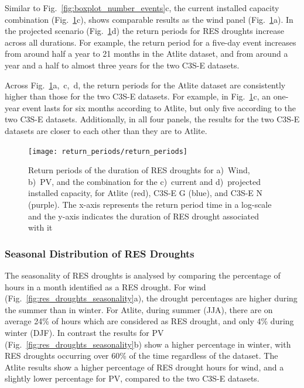 \documentclass[a4paper, 11pt]{article}
\begin{document}
Similar to Fig.~\ref{fig:boxplot_number_events}c, the current installed capacity combination (Fig.~\ref{fig:return_periods}c), shows comparable results as the wind panel (Fig.~\ref{fig:return_periods}a). In the projected scenario (Fig.~\ref{fig:return_periods}d) the return periods for RES droughts increase across all durations. For example, the return period for a five-day event increases from around half a year to 21 months in the Atlite dataset, and from around a year and a half to almost three years for the two C3S-E datasets.

Across Fig.~\ref{fig:return_periods}a,~c,~d, the return periods for the Atlite dataset are consistently higher than those for the two C3S-E datasets. For example, in Fig.~\ref{fig:return_periods}c, an one-year event lasts for six months according to Atlite, but only five according to the two C3S-E datasets. Additionally, in all four panels, the results for the two C3S-E datasets are closer to each other than they are to Atlite.

\begin{figure}[!ht]
	\centering
	\texttt{[image: return\_periods/return\_periods]}
	\caption{Return periods of the duration of RES droughts for a)~Wind, b)~PV, and the combination for the c)~current and d)~projected installed capacity, for Atlite (red), C3S-E G (blue), and C3S-E N (purple). The x-axis represents the return period time in a log-scale and the y-axis indicates the duration of RES drought associated with it}
	\label{fig:return_periods}
\end{figure}

\newpage
\subsubsection{Seasonal Distribution of RES Droughts}

The seasonality of RES droughts is analysed by comparing the percentage of hours in a month identified as a RES drought. For wind (Fig.~\ref{fig:res_droughts_seasonality}a), the drought percentages are higher during the summer than in winter. For Atlite, during summer (JJA), there are on average 24\% of hours which are considered as RES drought, and only 4\% during winter (DJF). In contrast the results for PV (Fig.~\ref{fig:res_droughts_seasonality}b)  show a higher percentage in winter, with RES droughts occurring  over 60\% of the time regardless of the dataset. The Atlite results show a higher percentage of RES drought hours for wind, and a slightly lower percentage for PV, compared to the two C3S-E datasets. 
\end{document}
